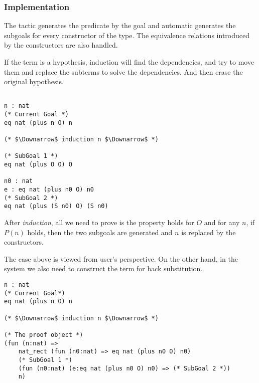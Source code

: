 \subsubsection*{Implementation}

The tactic generates the predicate by the goal and automatic generates the subgoals for every constructor of the type.
The equivalence relations introduced by the constructors are also handled.

If the term is a hypothesis, induction will find the dependencies, and try to move them and replace the subterms to solve the dependencies.
And then erase the original hypothesis.

\begin{center}
\begin{minipage}{0.7\textwidth}
\begin{verbatim}
                                                                   
n : nat                                                            
(* Current Goal *)   
eq nat (plus n O) n                       

(* $\Downarrow$ induction n $\Downarrow$ *)

(* SubGoal 1 *)    
eq nat (plus O O) O

n0 : nat                     
e : eq nat (plus n0 O) n0    
(* SubGoal 2 *)              
eq nat (plus (S n0) O) (S n0)
\end{verbatim}
\end{minipage}
\end{center}

After {\it induction}, all we need to prove is the property holds for $O$ and for any $n$, if $P(n)$ holds,
then the two subgoals are generated and $n$ is replaced by the constructors.

The case above is viewed from user's perspective.
On the other hand, in the system we also need to construct the term for back substitution.
\begin{center}
\begin{minipage}{\textwidth}
\begin{verbatim}
n : nat                               
(* Current Goal*)                              
eq nat (plus n O) n                             

(* $\Downarrow$ induction n $\Downarrow$ *)   

(* The proof object *)
(fun (n:nat) =>   
    nat_rect (fun (n0:nat) => eq nat (plus n0 O) n0)
    (* SubGoal 1 *)
    (fun (n0:nat) (e:eq nat (plus n0 O) n0) => (* SubGoal 2 *))
    n)                                                      
\end{verbatim}
\end{minipage}
\end{center}

